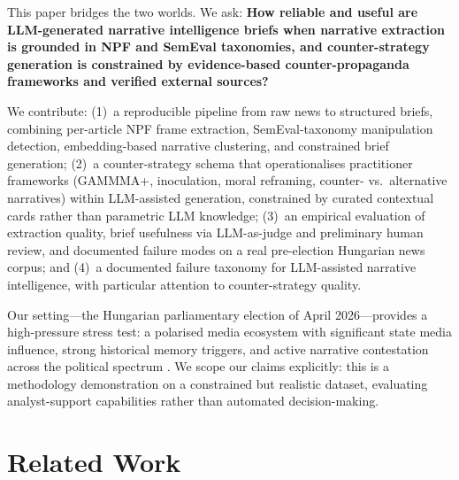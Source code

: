 \documentclass[10pt, a4paper]{article}
\begin{document}
This paper bridges the two worlds. We ask: \textbf{How reliable and useful are LLM-generated narrative intelligence briefs when narrative extraction is grounded in NPF and SemEval taxonomies, and counter-strategy generation is constrained by evidence-based counter-propaganda frameworks and verified external sources?}

We contribute: (1)~a reproducible pipeline from raw news to structured briefs, combining per-article NPF frame extraction, SemEval-taxonomy manipulation detection, embedding-based narrative clustering, and constrained brief generation; (2)~a counter-strategy schema that operationalises practitioner frameworks (GAMMMA+, inoculation, moral reframing, counter- vs.\ alternative narratives) within LLM-assisted generation, constrained by curated contextual cards rather than parametric LLM knowledge; (3)~an empirical evaluation of extraction quality, brief usefulness via LLM-as-judge and preliminary human review, and documented failure modes on a real pre-election Hungarian news corpus; and (4)~a documented failure taxonomy for LLM-assisted narrative intelligence, with particular attention to counter-strategy quality.

Our setting---the Hungarian parliamentary election of April 2026---provides a high-pressure stress test: a polarised media ecosystem with significant state media influence, strong historical memory triggers, and active narrative contestation across the political spectrum \citep{resist2019}. We scope our claims explicitly: this is a methodology demonstration on a constrained but realistic dataset, evaluating analyst-support capabilities rather than automated decision-making.


\section{Related Work}
\label{sec:related}
\end{document}
